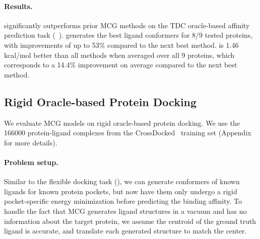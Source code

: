 \paragraph{Results.}
\model significantly outperforms prior MCG methods on the TDC oracle-based affinity prediction task (~).
\model generates the best ligand conformers for 8/9 tested proteins, with improvements of up to 53\% compared to the next best method. 
\model is 1.46 kcal/mol better than all methods when averaged over all 9 proteins, which corresponds to a 14.4\% improvement on average compared to the next best method.
\subsection{Rigid Oracle-based Protein Docking}
\vspace{-1ex}
\label{sec:rigid}
We evaluate MCG models on rigid oracle-based protein docking. We use the 166000 protein-ligand complexes from the CrossDocked~\citep{CrossDocked} training set (Appendix~ for more details).

\vspace{-1ex}
\paragraph{Problem setup.} Similar to the flexible docking task (), we can generate conformers of known ligands for known protein pockets, but now have them only undergo a rigid pocket-specific energy minimization before predicting the binding affinity. 
To handle the fact that MCG generates ligand structures in a vacuum and has no information about the target protein, we assume the centroid of the ground truth ligand is accurate, and translate each generated structure to match the center.

